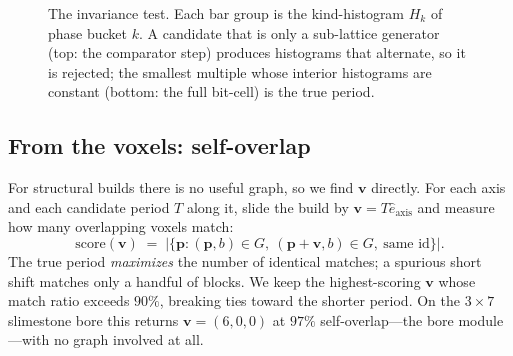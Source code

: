 \documentclass[11pt]{article}
\newcommand{\vv}{\mathbf{v}}
\newcommand{\pp}{\mathbf{p}}
\begin{document}
\begin{figure}[ht]
\centering
{}
\caption{The invariance test. Each bar group is the kind-histogram $H_k$ of phase
bucket $k$. A candidate that is only a sub-lattice generator (top: the
comparator step) produces histograms that alternate, so it is rejected; the
smallest multiple whose interior histograms are constant (bottom: the full
bit-cell) is the true period.}
\label{fig:invariance}
\end{figure}

\subsection{From the voxels: self-overlap}\label{sec:voxelperiod}

For structural builds there is no useful graph, so we find $\vv$ directly. For
each axis and each candidate period $T$ along it, slide the build by
$\vv=T\hat{e}_{\text{axis}}$ and measure how many overlapping voxels match:
\[
\mathrm{score}(\vv) \;=\; \bigl|\{\pp : (\pp,b)\in G,\ (\pp+\vv,b)\in G,\ \text{same id}\}\bigr|.
\]
The true period \emph{maximizes} the number of identical matches; a spurious
short shift matches only a handful of blocks. We keep the highest-scoring
$\vv$ whose match ratio exceeds $90\%$, breaking ties toward the shorter period.
On the $3{\times}7$ slimestone bore this returns $\vv=(6,0,0)$ at $97\%$
self-overlap---the bore module---with no graph involved at all.
\end{document}
